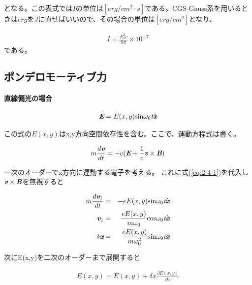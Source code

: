 \documentclass[a4paper,11pt,titlepage]{jarticle}
\numberwithin{equation}{section} %
\begin{document}
  となる。この表式では$I$の単位は$[erg/cm^2\cdot s]$である。CGS-Gauss系を用いるときは$erg$を$J$に直せばいいので、その場合の単位は$[erg/cm^2]$となり、
  
  \begin{eqnarray}
    I= \frac{E_0^2 c}{8 \pi} \times 10^{-7}
  \end{eqnarray}
  である。



  \subsection{ポンデロモーティブ力}

  \paragraph*{直線偏光の場合}
  
  \begin{eqnarray}
    \label{eq:2-4-1}
    \textit{\textbf{E}} =E(x,y) \rm{sin} \omega _0 \textit{t} \hat{\textit{\textbf{x}}}
  \end{eqnarray}
  
  この式の$E(x,y)$はx,y方向空間依存性を含む。ここで、運動方程式は書く。
  
  \begin{eqnarray}
    \label{eq:2-4-2}
    m \frac{d \textit{\textbf{v}}}{dt} =-e \lparen \textit{\textbf{E}} + \frac{1}{c}\textit{\textbf{v}} \times \textit{\textbf{B}} \rparen
  \end{eqnarray}
  
  一次のオーダーでx方向に運動する電子を考える。
  これに式(\ref*{eq:2-4-1})を代入し$\textit{\textbf{v}} \times \textit{\textbf{B}}$を無視すると
  
  \begin{eqnarray}
    m \frac{d \textit{\textbf{v}}_1}{dt} &=& -e E(x,y) \rm{sin} \omega _0 \textit{t} \hat{\textit{\textbf{x}}}\\
    \textit{\textbf{v}}_1 &=& \frac{e E(x,y)}{m \omega _0} \rm{cos} \omega _0 \textit{t} \hat{\textit{\textbf{x}}}\\
    \delta \textit{\textbf{x}} &=& \frac{e E(x,y)}{m \omega _0^2} \rm{sin} \omega _0 \textit{t} \hat{\textit{\textbf{x}}}
  \end{eqnarray} 
  
  次にE(x,y)を二次のオーダーまで展開すると
  
  \begin{eqnarray}
    E(x,y) = E(x,y) + \delta x \frac{\partial E(x,y)}{\partial x}
  \end{eqnarray}
  
\end{document}
